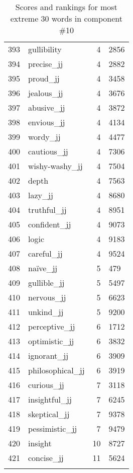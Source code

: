 \begin{longtable}[!htbp]{| rlr@{.}l |}
    393 & gullibility & 4 & 2856 \\
    394 & precise\_jj & 4 & 2882 \\
    395 & proud\_jj & 4 & 3458 \\
    396 & jealous\_jj & 4 & 3676 \\
    397 & abusive\_jj & 4 & 3872 \\
    398 & envious\_jj & 4 & 4134 \\
    399 & wordy\_jj & 4 & 4477 \\
    400 & cautious\_jj & 4 & 7306 \\
    401 & wishy-washy\_jj & 4 & 7504 \\
    402 & depth & 4 & 7563 \\
    403 & lazy\_jj & 4 & 8680 \\
    404 & truthful\_jj & 4 & 8951 \\
    405 & confident\_jj & 4 & 9073 \\
    406 & logic & 4 & 9183 \\
    407 & careful\_jj & 4 & 9524 \\
    408 & naïve\_jj & 5 & 479 \\
    409 & gullible\_jj & 5 & 5497 \\
    410 & nervous\_jj & 5 & 6623 \\
    411 & unkind\_jj & 5 & 9200 \\
    412 & perceptive\_jj & 6 & 1712 \\
    413 & optimistic\_jj & 6 & 3832 \\
    414 & ignorant\_jj & 6 & 3909 \\
    415 & philosophical\_jj & 6 & 3919 \\
    416 & curious\_jj & 7 & 3118 \\
    417 & insightful\_jj & 7 & 6245 \\
    418 & skeptical\_jj & 7 & 9378 \\
    419 & pessimistic\_jj & 7 & 9479 \\
    420 & insight & 10 & 8727 \\
    421 & concise\_jj & 11 & 5624 \\
    \hline
    \caption{Scores and rankings for most extreme 30 words in component \#10} \\
\end{longtable}
